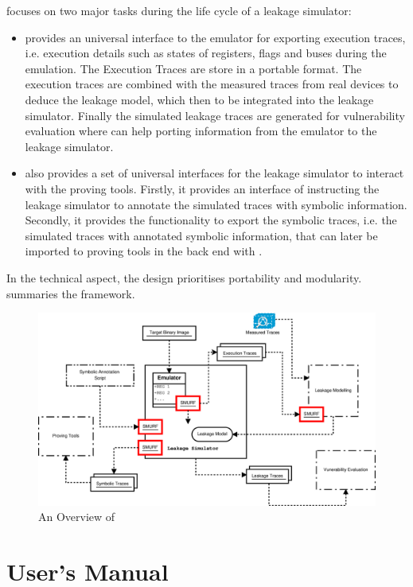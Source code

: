 \documentclass[]{report}
\begin{document}
\smurf focuses on two major tasks during the life cycle of a leakage simulator:
\begin{itemize}
	\item \smurf  provides an universal interface to the emulator for exporting execution traces, i.e. execution details such as states of registers, flags and buses during the emulation. The Execution Traces are store in a portable format. The execution traces are combined with the measured traces from real devices to deduce the leakage model, which then to be integrated into the leakage simulator. Finally the simulated leakage traces are generated for vulnerability evaluation where \smurf can help porting information from the emulator to the leakage simulator.
	
	\item \smurf also provides a set of universal interfaces for the leakage simulator to interact with the proving tools. Firstly, it provides an interface of instructing the leakage simulator to annotate the simulated traces with symbolic information. Secondly, it provides the functionality to export the symbolic traces, i.e. the simulated traces with annotated symbolic information, that can later be imported to proving tools in the back end with \smurf.
\end{itemize}

In the technical aspect, the \smurf design prioritises portability and modularity.  summaries the framework.

\begin{figure}
	\centering
	\includegraphics[width=0.9\linewidth]{./Figures/Overview.eps}
	\caption{An Overview of \smurf \label{fig:Overview}}
\end{figure}


\chapter{User's Manual}
\end{document}
